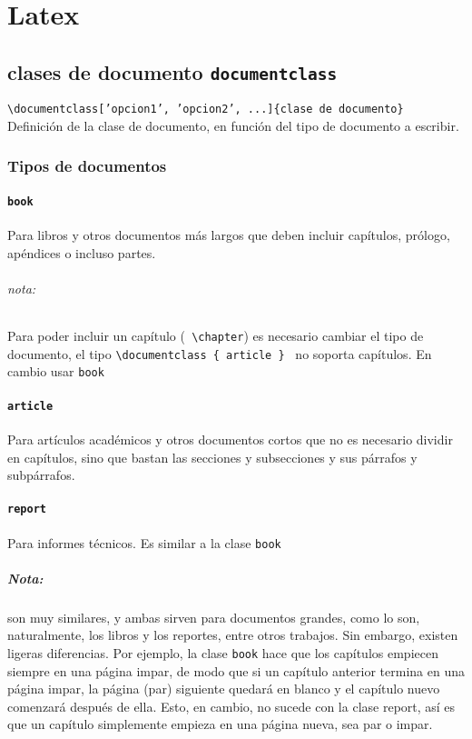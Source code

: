 
\chapter{Latex}

\section{clases de documento \texttt{documentclass}}

\raggedright  \texttt{\textbackslash documentclass['opcion1', 'opcion2', ...]\{clase de documento\}} \\

  Definición de la clase de documento, en función del tipo de documento a escribir.

\subsection*{Tipos de documentos}

\subsubsection{\texttt{book}}

Para libros y otros documentos más largos que deben incluir capítulos, prólogo, apéndices o incluso partes.

\subparagraph{nota:}
\raggedright Para poder incluir un capítulo (\texttt{ \textbackslash chapter}) es necesario cambiar el tipo de documento, el tipo \texttt{\textbackslash documentclass \{ article \} } no soporta capítulos. En cambio usar \texttt{book}

\subsubsection{\texttt{article}}

Para artículos académicos y otros documentos cortos que no es necesario dividir en capítulos, sino que bastan las secciones y subsecciones y sus párrafos y subpárrafos.

\subsubsection{\texttt{report}}

Para informes técnicos. Es similar a la clase \texttt{book}

\paragraph{Nota:}  son muy similares, y ambas sirven para documentos grandes, como lo son, naturalmente, los libros y los reportes, entre otros trabajos. Sin embargo, existen ligeras diferencias. Por ejemplo, la clase \texttt{book} hace que los capítulos empiecen siempre en una página impar, de modo que si un capítulo anterior termina en una página impar, la página (par) siguiente quedará en blanco y el capítulo nuevo comenzará después de ella. Esto, en cambio, no sucede con la clase report, así es que un capítulo simplemente empieza en una página nueva, sea par o impar.

